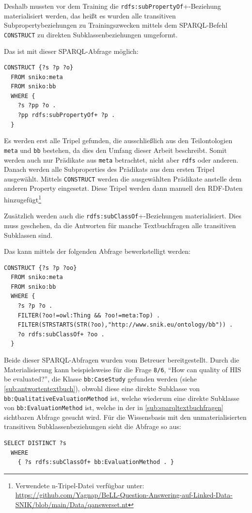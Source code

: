 \documentclass[utf8,biblatex]{lni}
\begin{document}
Deshalb mussten vor dem Training die \texttt{rdfs:subPropertyOf}+-Beziehung materialisiert werden,
das heißt es wurden alle transitiven Subpropertybeziehungen zu Trainingszwecken mittels dem SPARQL-Befehl \texttt{CONSTRUCT} zu direkten Subklassenbeziehungen umgeformt.

Das ist mit dieser SPARQL-Abfrage möglich:
\begin{lstlisting}[language=SPARQL]
  CONSTRUCT {?s ?p ?o}
  FROM sniko:meta
  FROM sniko:bb
  WHERE {
    ?s ?pp ?o .
    ?pp rdfs:subPropertyOf+ ?p . 
  }
\end{lstlisting}

Es werden erst alle Tripel gefunden, die ausschließlich aus den Teilontologien \texttt{meta} und \texttt{bb} bestehen, da dies den Umfang dieser Arbeit beschreibt.
Somit werden auch nur Prädikate aus \texttt{meta} betrachtet, nicht aber \texttt{rdfs} oder anderen.
Danach werden alle Subproperties des Prädikats aus dem ersten Tripel ausgewählt.
Mittels \texttt{CONSTRUCT} werden die ausgewählten Prädikate anstelle dem anderen Property eingesetzt.
Diese Tripel werden dann manuell den RDF-Daten hinzugefügt\footnote{Verwendete n-Tripel-Datei verfügbar unter:\\\url{https://github.com/Yagnap/BeLL-Question-Answering-auf-Linked-Data-SNIK/blob/main/Data/qanswerset.nt}}

Zusätzlich werden auch die \texttt{rdfs:subClassOf}+-Beziehungen materialisiert.
Dies muss geschehen, da die Antworten für manche Textbuchfragen alle transitiven Subklassen sind.

Das kann mittels der folgenden Abfrage bewerkstelligt werden:
\begin{lstlisting}[language=SPARQL]
  CONSTRUCT {?s ?p ?oo}
  FROM sniko:meta
  FROM sniko:bb
  WHERE {
    ?s ?p ?o . 
    FILTER(?oo!=owl:Thing && ?oo!=meta:Top) .
    FILTER(STRSTARTS(STR(?oo),"http://www.snik.eu/ontology/bb")) .
    ?o rdfs:subClassOf+ ?oo .
  }
\end{lstlisting}

Beide dieser SPARQL-Abfragen wurden vom Betreuer bereitgestellt.
Durch die Materialisierung kann beispielsweise für die Frage \texttt{8/6}, \enquote{How can quality of HIS be evaluated?},
die Klasse \texttt{bb:CaseStudy} gefunden werden (siehe \cref{sub:antwortentextbuch}), obwohl diese eine direkte Subklasse von \texttt{bb:QualitativeEvaluationMethod} ist,
welche wiederum eine direkte Subklasse von \texttt{bb:EvaluationMethod} ist, welche in der in \cref{sub:sparqltextbuchfragen} sichtbaren Abfrage gesucht wird.
Für die Wissensbasis mit den unmaterialisierten transitiven Subklassenbeziehungen sieht die Abfrage so aus:
\begin{lstlisting}[language=SPARQL]
  SELECT DISTINCT ?s
  WHERE
    { ?s rdfs:subClassOf+ bb:EvaluationMethod . }
\end{lstlisting}
\end{document}
